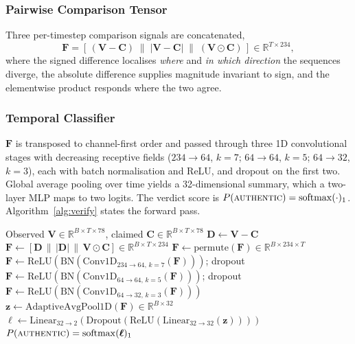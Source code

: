 \documentclass[journal]{IEEEtran}
\begin{document}
\subsubsection{Pairwise Comparison Tensor}
Three per-timestep comparison signals are concatenated,
\begin{equation}
\mathbf{F} = \left[\, (\mathbf{V}-\mathbf{C}) \;\|\;
|\mathbf{V}-\mathbf{C}| \;\|\;
(\mathbf{V} \odot \mathbf{C}) \,\right] \in \mathbb{R}^{T \times 234},
\end{equation}
where the signed difference localises \emph{where} and \emph{in which
direction} the sequences diverge, the absolute difference supplies magnitude
invariant to sign, and the elementwise product responds where the two agree.

\subsubsection{Temporal Classifier}
$\mathbf{F}$ is transposed to channel-first order and passed through three 1D
convolutional stages with decreasing receptive fields
($234 \rightarrow 64$, $k=7$; $64 \rightarrow 64$, $k=5$;
$64 \rightarrow 32$, $k=3$), each with batch normalisation and ReLU, and
dropout on the first two. Global average pooling over time yields a
32-dimensional summary, which a two-layer MLP maps to two logits. The verdict
score is $P(\textsc{authentic}) = \mathrm{softmax}(\cdot)_1$.
Algorithm~\ref{alg:verify} states the forward pass.

\begin{algorithm}[!t]
\caption{Difference-Based Verification Forward Pass}
\label{alg:verify}
\begin{algorithmic}[1]
\REQUIRE Observed $\mathbf{V} \in \mathbb{R}^{B\times T\times 78}$,
         claimed $\mathbf{C} \in \mathbb{R}^{B\times T\times 78}$
\STATE $\mathbf{D} \leftarrow \mathbf{V} - \mathbf{C}$
\STATE $\mathbf{F} \leftarrow [\mathbf{D} \,\|\, |\mathbf{D}| \,\|\,
        \mathbf{V}\odot\mathbf{C}] \in \mathbb{R}^{B\times T\times 234}$
\STATE $\mathbf{F} \leftarrow \mathrm{permute}(\mathbf{F})
        \in \mathbb{R}^{B\times 234\times T}$
\STATE $\mathbf{F} \leftarrow \mathrm{ReLU}(\mathrm{BN}(
        \mathrm{Conv1D}_{234\rightarrow 64,\,k=7}(\mathbf{F})))$; dropout
\STATE $\mathbf{F} \leftarrow \mathrm{ReLU}(\mathrm{BN}(
        \mathrm{Conv1D}_{64\rightarrow 64,\,k=5}(\mathbf{F})))$; dropout
\STATE $\mathbf{F} \leftarrow \mathrm{ReLU}(\mathrm{BN}(
        \mathrm{Conv1D}_{64\rightarrow 32,\,k=3}(\mathbf{F})))$
\STATE $\mathbf{z} \leftarrow \mathrm{AdaptiveAvgPool1D}(\mathbf{F})
        \in \mathbb{R}^{B\times 32}$
\STATE $\boldsymbol{\ell} \leftarrow
        \mathrm{Linear}_{32\rightarrow 2}(\mathrm{Dropout}(\mathrm{ReLU}(
        \mathrm{Linear}_{32\rightarrow 32}(\mathbf{z}))))$
\RETURN $P(\textsc{authentic}) = \mathrm{softmax}(\boldsymbol{\ell})_1$
\end{algorithmic}
\end{algorithm}
\end{document}
